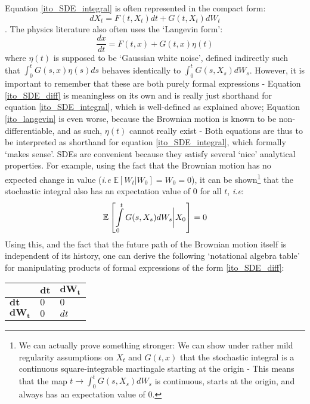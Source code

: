 Equation \eqref{ito_SDE_integral} is often represented in the compact form:
\begin{equation}
\label{ito_SDE_diff}
dX_t = F(t,X_t)dt + G(t,X_t)dW_t
\end{equation}
. The physics literature also often uses the `Langevin form':
\begin{equation}
\label{ito_langevin}
\frac{dx}{dt} = F(t,x) + G(t,x)\eta(t)
\end{equation}
where $\eta(t)$ is supposed to be `Gaussian white noise', defined indirectly such that $\int_0^{t}G(s,x)\eta(s)ds$ behaves identically to $\int_0^{t}G(s,X_s)dW_s$. However, it is important to remember that these are both purely formal expressions - Equation \eqref{ito_SDE_diff} is meaningless on its own and is really just shorthand for equation \eqref{ito_SDE_integral}, which is well-defined as explained above; Equation \eqref{ito_langevin} is even worse, because the Brownian motion is known to be non-differentiable, and as such, $\eta(t)$ cannot really exist - Both equations are thus to be interpreted as shorthand for equation \eqref{ito_SDE_integral}, which formally `makes sense'. SDEs are convenient because they satisfy several `nice' analytical properties. For example, using the fact that the Brownian motion has no expected change in value (\emph{i.e} $\mathbb{E}[W_t | W_0] = W_0 = 0$), it can be shown\footnote{We can actually prove something stronger: We can show under rather mild regularity assumptions on $X_t$ and $G(t,x)$ that the stochastic integral is a continuous square-integrable martingale starting at the origin - This means that the map $t \to \int_0^{t}G(s,X_s)dW_s$ is continuous, starts at the origin, and always has an expectation value of $0$.} that the stochastic integral also has an expectation value of $0$ for all $t$, \emph{i.e}:
\begin{equation*}
\mathbb{E}\left[\int\limits_{0}^{t} G(s,X_s)dW_s \bigg{|} X_0\right] = 0
\end{equation*}
Using this, and the fact that the future path of the Brownian motion itself is independent of its history, one can derive the following `notational algebra table' for manipulating products of formal expressions of the form \eqref{ito_SDE_diff}:
\\
\begin{center}
	\begin{tabularx}{0.4\textwidth}{ 
			| >{\centering\arraybackslash}X 
			| >{\centering\arraybackslash}X 
			| >{\centering\arraybackslash}X | }
		\hline
		& $\mathbf{dt}$ & $\mathbf{dW_t}$ \\
		\hline
		$\mathbf{dt}$ & $0$  &  $0$ \\ 
		\hline
		$\mathbf{dW_t}$ & $0$  & $dt$ \\
		\hline
	\end{tabularx}
\end{center}
